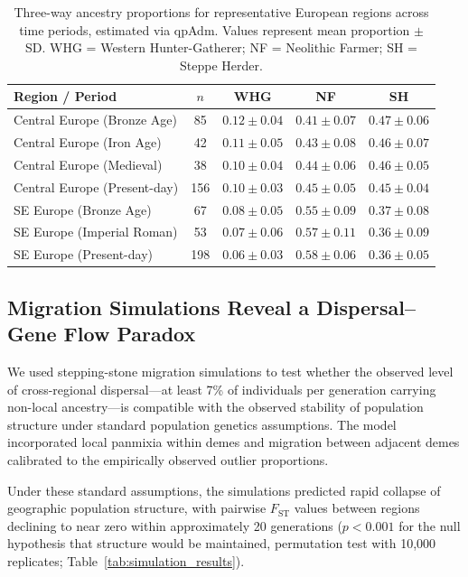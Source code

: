 \documentclass[11pt]{article}
\begin{document}
\begin{table}[H]
\centering
\caption{Three-way ancestry proportions for representative European regions across time periods, estimated via qpAdm. Values represent mean proportion $\pm$ SD. WHG = Western Hunter-Gatherer; NF = Neolithic Farmer; SH = Steppe Herder.}
\label{tab:ancestry_components}
\begin{tabular}{lcccc}
\toprule
\textbf{Region / Period} & \textbf{$n$} & \textbf{WHG} & \textbf{NF} & \textbf{SH} \\
\midrule
Central Europe (Bronze Age) & 85 & $0.12 \pm 0.04$ & $0.41 \pm 0.07$ & $0.47 \pm 0.06$ \\
Central Europe (Iron Age) & 42 & $0.11 \pm 0.05$ & $0.43 \pm 0.08$ & $0.46 \pm 0.07$ \\
Central Europe (Medieval) & 38 & $0.10 \pm 0.04$ & $0.44 \pm 0.06$ & $0.46 \pm 0.05$ \\
Central Europe (Present-day) & 156 & $0.10 \pm 0.03$ & $0.45 \pm 0.05$ & $0.45 \pm 0.04$ \\
\midrule
SE Europe (Bronze Age) & 67 & $0.08 \pm 0.05$ & $0.55 \pm 0.09$ & $0.37 \pm 0.08$ \\
SE Europe (Imperial Roman) & 53 & $0.07 \pm 0.06$ & $0.57 \pm 0.11$ & $0.36 \pm 0.09$ \\
SE Europe (Present-day) & 198 & $0.06 \pm 0.03$ & $0.58 \pm 0.06$ & $0.36 \pm 0.05$ \\
\bottomrule
\end{tabular}
\end{table}

\subsection{Migration Simulations Reveal a Dispersal--Gene Flow Paradox}

We used stepping-stone migration simulations to test whether the observed level of cross-regional dispersal---at least 7\% of individuals per generation carrying non-local ancestry---is compatible with the observed stability of population structure under standard population genetics assumptions. The model incorporated local panmixia within demes and migration between adjacent demes calibrated to the empirically observed outlier proportions.

Under these standard assumptions, the simulations predicted rapid collapse of geographic population structure, with pairwise $F_{\text{ST}}$ values between regions declining to near zero within approximately 20 generations ($p < 0.001$ for the null hypothesis that structure would be maintained, permutation test with 10,000 replicates; Table~\ref{tab:simulation_results}).
\end{document}
